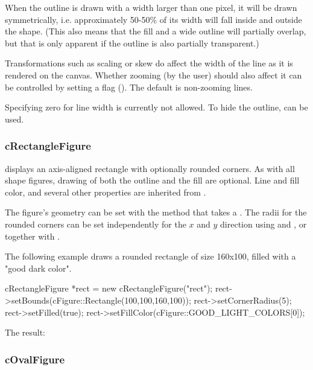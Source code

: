 When the outline is drawn with a width larger than one pixel, it will be
drawn symmetrically, i.e. approximately 50-50\% of its width will fall
inside and outside the shape. (This also means that the fill and a wide
outline will partially overlap, but that is only apparent if the
outline is also partially transparent.)

Transformations such as scaling or skew do affect the width of the line as it
is rendered on the canvas. Whether zooming (by the user) should also affect
it can be controlled by setting a flag ().
The default is non-zooming lines.

Specifying zero for line width is currently not allowed. To hide the outline,
 can be used.


\subsubsection{cRectangleFigure}
\label{sec:graphics:rectanglefigure}

 displays an axis-aligned rectangle with
optionally rounded corners. As with all shape figures, drawing of both the
outline and the fill are optional. Line and fill color, and several other
properties are inherited from .

The figure's geometry can be set with the  method that
takes a . The radii for the rounded corners can
be set independently for the $x$ and $y$ direction using
 and , or together with
.

The following example draws a rounded rectangle of size 160x100, filled with
a "good dark color".

\begin{cpp}
cRectangleFigure *rect = new cRectangleFigure("rect");
rect->setBounds(cFigure::Rectangle(100,100,160,100));
rect->setCornerRadius(5);
rect->setFilled(true);
rect->setFillColor(cFigure::GOOD_LIGHT_COLORS[0]);
\end{cpp}


The result:

\begin{center}

\end{center}


\subsubsection{cOvalFigure}
\label{sec:graphics:ovalfigure}

